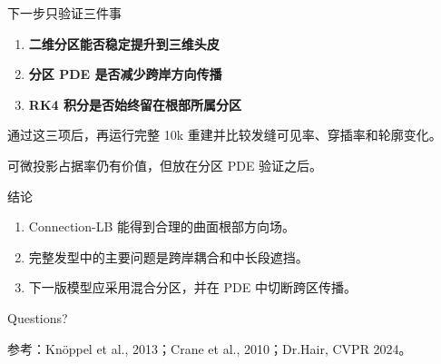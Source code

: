 \documentclass[10pt,aspectratio=169]{beamer}
\begin{document}
\begin{frame}{下一步只验证三件事}
\begin{enumerate}
  \setlength{\itemsep}{1.2em}
  \item \textbf{二维分区能否稳定提升到三维头皮}
  \item \textbf{分区 PDE 是否减少跨岸方向传播}
  \item \textbf{RK4 积分是否始终留在根部所属分区}
\end{enumerate}

\vspace{1.5em}
通过这三项后，再运行完整 10k 重建并比较发缝可见率、穿插率和轮廓变化。

\vfill
\footnotesize
可微投影占据率仍有价值，但放在分区 PDE 验证之后。
\end{frame}

\begin{frame}{结论}
\Large
\begin{enumerate}
  \setlength{\itemsep}{1.1em}
  \item Connection-LB 能得到合理的曲面根部方向场。
  \item 完整发型中的主要问题是跨岸耦合和中长段遮挡。
  \item 下一版模型应采用混合分区，并在 PDE 中切断跨区传播。
\end{enumerate}

\vfill
\centering
\Huge Questions?

\vspace{0.8em}
\tiny
参考：Knöppel et al., 2013；Crane et al., 2010；Dr.Hair, CVPR 2024。
\end{frame}
\end{document}
